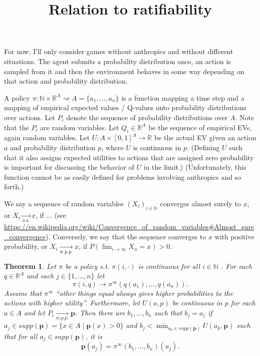 \documentclass{article}
\title{Relation to ratifiability}
\newtheorem{thm}{Theorem} %
\begin{document}
\maketitle

For now, I'll only consider games without anthropics and without different situations. The agent submits a probability distribution once, an action is sampled from it and then the environment behaves in some way depending on that action and probability distribution.

A policy $\pi:\mathbb{N}\times \mathbb{R}^A \rightsquigarrow A=\{a_1,...,a_n\}$ is a function mapping a time step and a mapping of empirical expected values / Q-values onto probability distributions over actions. Let $P_i$ denote the sequence of probability distributions over $A$. Note that the $P_i$ are random variables. Let $Q_i\in \mathbb{R}^A$ be the sequence of empirical EVs, again random variables. Let $U:A\times \left[0,1 \right]^A \rightarrow \mathbb{R}$ be the actual EV given an action $a$ and probability distribution $p$, where $U$ is continuous in $p$. (Defining $U$ such that it also assigns expected utilities to actions that are assigned zero probability is important for discussing the behavior of $U$ in the limit.) (Unfortunately, this function cannot be as easily defined for problems involving anthropics and so forth.)

We say a sequence of random variables $(X_i)_{i\in\mathbb{N}}$ converges almost surely to $x$, or $X_i\underset{\text{a.s.}}{\rightarrow} x$, if ... (see \url{https://en.wikipedia.org/wiki/Convergence_of_random_variables#Almost_sure_convergence}). Conversely, we say that the sequence converges to $x$ with positive probability, or $X_i\underset{\text{w.p.p.}}{\rightarrow} x$, if $P(\lim_{i\rightarrow \infty } X_n = x)>0$.

\begin{thm}
Let $\pi$ be a policy s.t. $\pi(i,\cdot)$ is continuous for all $i\in \mathbb{N}$ . For each $q\in \mathbb{R}^A$ and each $j\in \{1,...,n\}$ let
\begin{equation}
\pi (i, q) \rightarrow \pi^\infty (q(a_1),...,q(a_n)).
\end{equation}
Assume that $\pi^\infty$ \enquote{other things equal always gives higher probabilities to the actions with higher utility}.
Furthermore, let $U(a,p)$ be continuous in $p$ for each $a\in A$ and let $P_i \underset{w.p.p.}{\rightarrow} \mathbf{p}$. Then there are $b_1,...,b_n$ such that $b_j=a_j$ if $a_j\in supp (\mathbf{p})=\{x\in A\mid \mathbf{p}(x)>0 \}$ and $b_j<\min_{a_k\in supp (\mathbf{p}) } U(a_k,\mathbf{p})$ such that for all $a_j\in supp (\mathbf{p})$, it is
\begin{equation}
\mathbf{p}(a_j)=\pi^\infty (b_1,...,b_n) (a_j). %
\end{equation}
\end{thm}
\end{document}
